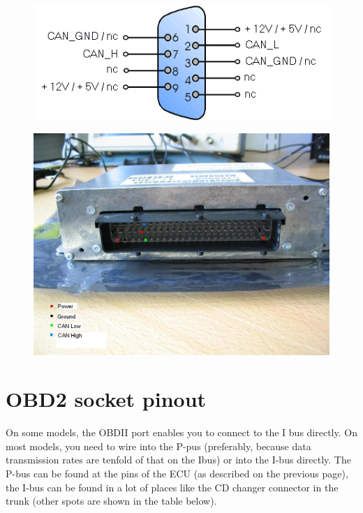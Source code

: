 \documentclass[11pt,a4paper]{book}
\begin{document}
\begin{figure}[]
    \centering
    \includegraphics[width=\linewidth]{db9-pinout.png}
    \caption{}
    \label{fig:}
\end{figure}
\begin{figure}[]
    \centering
    \includegraphics[width=\linewidth]{t7pinout.png}
    \caption{}
    \label{fig:}
\end{figure}

\section{OBD2 socket pinout}
On some models, the
OBDII port enables you to connect to the I bus directly. On most models, you
need to wire into the P-pus (preferably, because data transmission rates are
tenfold of that on the Ibus) or into the I-bus directly. The P-bus can be found
at the pins of the ECU (as described on the previous page), the I-bus can be
found in a lot of places like the CD changer connector in the trunk (other spots
are shown in the table below).
\end{document}
